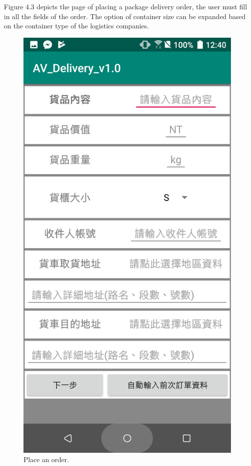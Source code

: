 \documentclass[12pt]{ksthesis}
\begin{document}
\begin{thesis}
{Figure 4.3 depicts the page of placing a package delivery order, the user must fill in all the fields of the order. The option of container size can be expanded based on the container type of the logistics companies.

\begin{figure}[H]
\centering
\includegraphics[scale=0.125]{./figures/F4-3-Place_an_order.PNG}
\caption{\large Place an order.}
\vspace{0.5cm}
\label{Fig:Place_an_order}
\end{figure}


}
\end{thesis}
\end{document}
